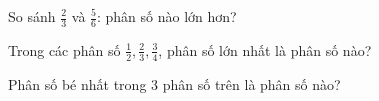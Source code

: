 \begin{ex}
So sánh $\frac{2}{3}$ và $\frac{5}{6}$: phân số nào lớn hơn?
\end{ex}

\begin{ex}
Trong các phân số $\frac{1}{2}, \frac{2}{3}, \frac{3}{4}$, phân số lớn nhất là phân số nào?
\end{ex}

\begin{ex}
Phân số bé nhất trong 3 phân số trên là phân số nào?
\end{ex}
